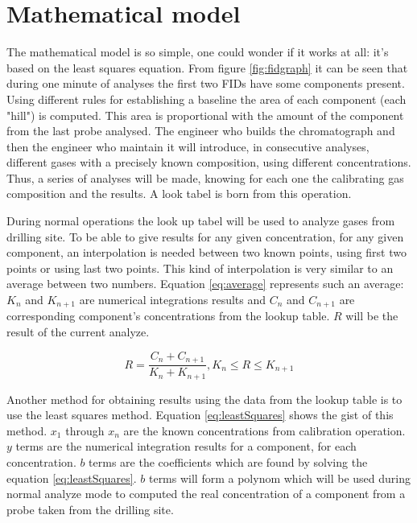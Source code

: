\documentclass[conference]{IEEEtran}
\begin{document}
\section{Mathematical model}

    The mathematical model is so simple, one could wonder if it works at all: it's based on the least squares equation.
    From figure \ref{fig:fidgraph} it can be seen that during one minute of analyses the first two FIDs have some components present.
    Using different rules for establishing a baseline the area of each component (each "hill") is computed. This area is 
    proportional with the amount of the component from the last probe analysed. The engineer who builds the chromatograph and then
    the engineer who maintain it will introduce, in consecutive analyses, different gases with a precisely known composition, using
    different concentrations. Thus, a series of analyses will be made, knowing for each one the calibrating gas composition and the
    results. A look tabel is born from this operation.

    During normal operations the look up tabel will be used to analyze gases from drilling site. To be able to give results for any
    given concentration, for any given component, an interpolation is needed between two known points, using first two points or
    using last two points. This kind of interpolation is very similar to an average between two numbers. Equation \ref{eq:average}
    represents such an average: \(K_n\) and \(K_{n+1}\) are numerical integrations results and  \(C_n\) and \(C_{n+1}\) are
    corresponding component's concentrations from the lookup table. \(R\) will be the result of the current analyze.    

    \begin{equation}
        R = \frac{C_n + C_{n+1}}{K_n + K_{n+1}}, K_{n} \leq R \leq K_{n+1}
        \label{eq:average}
    \end{equation}

    Another method for obtaining results using the data from the lookup table is to use the least squares method. Equation \ref{eq:leastSquares}
    shows the gist of this method. \(x_{1}\) through \(x_{n}\) are the known concentrations from calibration operation. \(y\) terms are
    the numerical integration results for a component, for each concentration. \(b\) terms are the coefficients which are found by 
    solving the equation \ref{eq:leastSquares}. \(b\) terms will form a polynom which will be used during normal analyze mode to computed
    the real concentration of a component from a probe taken from the drilling site.
\end{document}
